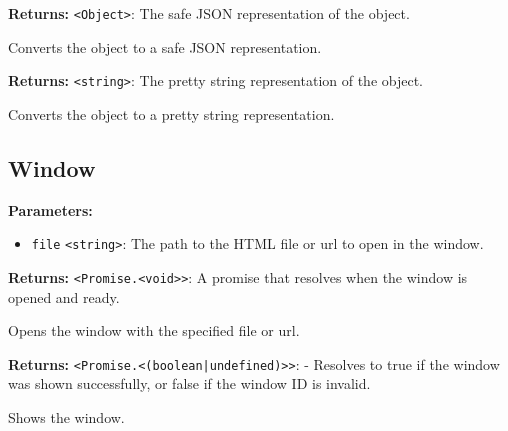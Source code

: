 \documentclass[12pt,a4paper]{article}
\begin{document}
\vspace{5mm}
\noindent {}


\noindent \textbf{Returns:} \texttt{<Object>}: The safe JSON representation of the object.

\noindent Converts the object to a safe JSON representation.

\vspace{5mm}
\noindent {}


\noindent \textbf{Returns:} \texttt{<string>}: The pretty string representation of the object.

\noindent Converts the object to a pretty string representation.


\subsection{Window}
\vspace{5mm}
\noindent {}


\noindent \textbf{Parameters:}
\begin{itemize}
  \item \texttt{file} \texttt{<string>}: The path to the HTML file or url to open in the window.
\end{itemize}

\noindent \textbf{Returns:} \texttt{<Promise.<void>>}: A promise that resolves when the window is opened and ready.

\noindent Opens the window with the specified file or url.

\vspace{5mm}
\noindent {}


\noindent \textbf{Returns:} \texttt{<Promise.<(boolean|undefined)>>}: - Resolves to \textasciigrave{}true\textasciigrave{} if the window was shown successfully, or \textasciigrave{}false\textasciigrave{} if the window ID is invalid.

\noindent Shows the window.
\end{document}
